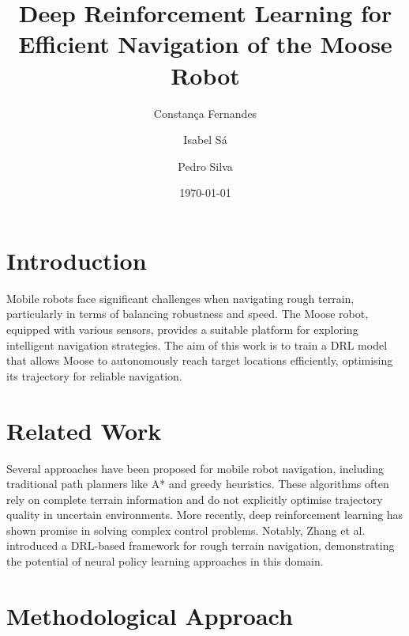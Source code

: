 \documentclass[11pt,twocolumn]{article}
\title{Deep Reinforcement Learning for Efficient Navigation of the Moose Robot}
\author{Constança Fernandes \and Isabel Sá \and Pedro Silva}
\date{\today}
\begin{document}

\section{Introduction}
Mobile robots face significant challenges when navigating rough terrain, particularly in terms of balancing robustness and speed. The Moose robot, equipped with various sensors, provides a suitable platform for exploring intelligent navigation strategies. The aim of this work is to train a DRL model that allows Moose to autonomously reach target locations efficiently, optimising its trajectory for reliable navigation.

\section{Related Work}

Several approaches have been proposed for mobile robot navigation, including traditional path planners like A* and greedy heuristics. These algorithms often rely on complete terrain information and do not explicitly optimise trajectory quality in uncertain environments. More recently, deep reinforcement learning has shown promise in solving complex control problems. Notably, Zhang et al. \cite{Zhang2018DRL} introduced a DRL-based framework for rough terrain navigation, demonstrating the potential of neural policy learning approaches in this domain.


\section{Methodological Approach}
\end{document}
